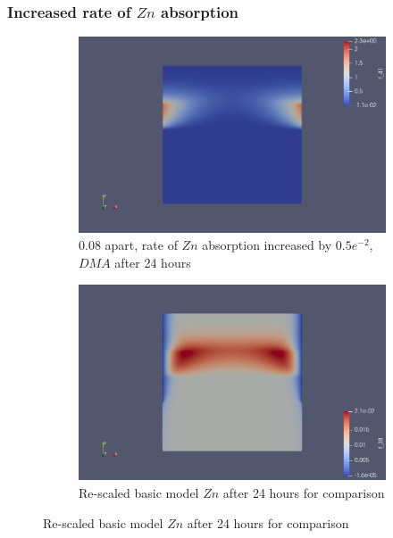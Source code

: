 \documentclass[11pt]{article}
\numberwithin{equation}{section}
\begin{document}
 \subsubsection{Increased rate of $Zn$ absorption}
 \begin{figure}
     \centering
     \caption{Distance and $DMA$ exudation increased}
     \begin{subfigure}[t]{0.45\textwidth}
     \includegraphics[width=\textwidth]{Figures/testpics/IncreasedZnAbsorbDMA24.png}
     \caption{0.08 apart, rate of $Zn$ absorption increased by $0.5e^{-2}$, $DMA$ after 24 hours}
     \end{subfigure}
     \begin{subfigure}[t]{0.45\textwidth}
     \includegraphics[width=\textwidth]{Figures/testpics/BasictoComparetoDistanceZn.png}
     \caption{Re-scaled basic model $Zn$ after 24 hours for comparison}
     \end{subfigure}
 \end{figure}
\end{document}
